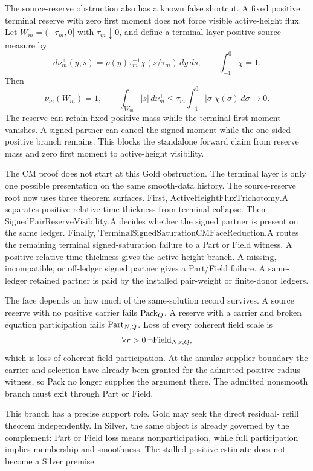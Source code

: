 The source-reserve obstruction also has a known false shortcut.  A
fixed positive terminal reserve with zero first moment does not force visible
active-height flux.  Let \(W_m=(-\tau_m,0]\) with \(\tau_m\downarrow0\), and
define a terminal-layer positive source measure by
\[
  d\nu_m^+(y,s)
  =
  \rho(y)\tau_m^{-1}\chi(s/\tau_m)\,dy\,ds,
  \qquad
  \int_{-1}^0\chi=1.
\]
Then
\[
  \nu_m^+(W_m)=1,
  \qquad
  \int_{W_m}|s|\,d\nu_m^+
  \le
  \tau_m\int_{-1}^0|\sigma|\chi(\sigma)\,d\sigma
  \to0.
\]
The reserve can retain fixed positive mass while the terminal first moment
vanishes.  A signed partner can cancel the signed moment while the one-sided
positive branch remains.  This blocks the standalone forward claim from
reserve mass and zero first moment to active-height visibility.

The CM proof does not start at this Gold obstruction.  The terminal layer is
only one possible presentation on the same smooth-data history.  The
source-reserve root now uses three theorem surfaces.  First,
\(\mathrm{ActiveHeightFluxTrichotomy.A}\) separates positive relative time
thickness from terminal collapse.  Then
\(\mathrm{SignedPairReserveVisibility.A}\) decides whether the signed
partner is present on the same ledger.  Finally,
\(\mathrm{TerminalSignedSaturationCMFaceReduction.A}\) routes the remaining
terminal signed-saturation failure to a Part or Field witness.
A positive relative time thickness gives the active-height branch.
A missing, incompatible, or off-ledger signed partner gives a Part/Field failure.
A same-ledger retained partner is paid by the installed pair-weight or
finite-donor ledgers.

The face depends on how much of the same-solution record survives.  A source
reserve with no positive carrier fails \(\mathrm{Pack}_Q\).  A reserve with a carrier
and broken equation participation fails \(\mathrm{Part}_{N,Q}\).  Loss of every
coherent field scale is
\[
  \forall r>0\,\neg\mathrm{Field}_{N,r,Q},
\]
which is loss of coherent-field participation.
At the annular supplier boundary the carrier and selection have already
been granted for the admitted positive-radius witness, so Pack no longer
supplies the argument there.  The admitted nonsmooth branch must exit through
Part or Field.

This branch has a precise support role.  Gold may seek the direct residual-
refill theorem independently.  In Silver, the same object is already governed
by the complement: Part or Field loss means nonparticipation, while full
participation implies membership and smoothness.  The stalled positive
estimate does not become a Silver premise.
